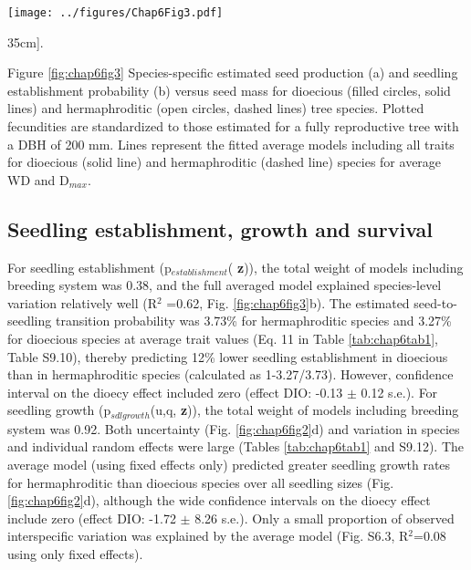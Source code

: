 \documentclass[b5paper,justified]{tufte-book} %
\begin{document}
\begin{fullwidth}
\begin{landscape}
\begin{figure*}
\hspace*{4cm} \texttt{[image: ../figures/Chap6Fig3.pdf]}
\caption[The proportion of interspecific variation in various demographic rates explained by the four functional traits][35cm]{.}
\label{fig:chap6fig3}
\hspace*{4cm} \begin{minipage}{20cm}
\footnotesize Figure \ref{fig:chap6fig3} 
Species-specific estimated seed production (a) and seedling establishment probability (b) versus seed mass for dioecious (filled circles, solid lines) and hermaphroditic (open circles, dashed lines) tree species. Plotted fecundities are standardized to those estimated for a fully reproductive tree with a DBH of 200 mm. Lines represent the fitted average models including all traits for dioecious (solid line) and hermaphroditic (dashed line) species for average WD and D$_{max}$. 
\end{minipage}
\end{figure*}
\end{landscape}

\subsection{Seedling establishment, growth and survival}
For seedling establishment (p$_{establishment}$( \textbf{z})), the total weight of models including breeding system was 0.38, and the full averaged model explained species-level variation relatively well (R$^2$ =0.62, Fig. \ref{fig:chap6fig3}b).  The estimated seed-to-seedling transition probability was 3.73\% for hermaphroditic species and 3.27\% for dioecious species at average trait values (Eq. 11 in Table \ref{tab:chap6tab1}, Table S9.10), thereby predicting 12\% lower seedling establishment in dioecious than in hermaphroditic species (calculated as 1-3.27/3.73). However, confidence interval on the dioecy effect included zero (effect DIO: -0.13 $\pm$ 0.12 s.e.).
For seedling growth (p$_{sdl growth}$(u,q, \textbf{z})), the total weight of models including breeding system was 0.92. Both uncertainty (Fig. \ref{fig:chap6fig2}d) and variation in species and individual random effects were large (Tables \ref{tab:chap6tab1} and S9.12). The average model (using fixed effects only) predicted greater seedling growth rates for hermaphroditic than dioecious species over all seedling sizes (Fig. \ref{fig:chap6fig2}d), although the wide confidence intervals on the dioecy effect include zero (effect DIO: -1.72 $\pm$ 8.26 s.e.). Only a small proportion of observed interspecific variation was explained by the average model (Fig. S6.3, R$^2$=0.08 using only fixed effects).  


\end{fullwidth}
\end{document}
